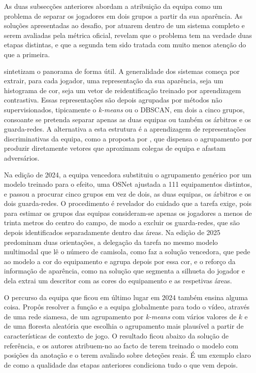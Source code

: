 As duas subsecções anteriores abordam a atribuição da equipa como um problema de separar os jogadores em dois grupos a partir da sua aparência. As soluções apresentadas ao desafio, por atuarem dentro de um sistema completo e serem avaliadas pela métrica oficial, revelam que o problema tem na verdade duas etapas distintas, e que a segunda tem sido tratada com muito menos atenção do que a primeira.

\citet{golovkin2025minimap} sintetizam o panorama de forma útil. A generalidade dos sistemas começa por extrair, para cada jogador, uma representação da sua aparência, seja um histograma de cor, seja um vetor de reidentificação treinado por aprendizagem contrastiva. Essas representações são depois agrupadas por métodos não supervisionados, tipicamente o \emph{k-means} ou o DBSCAN, em dois a cinco grupos, consoante se pretenda separar apenas as duas equipas ou também os árbitros e os guarda-redes. A alternativa a esta estrutura é a aprendizagem de representações discriminativas da equipa, como a proposta por \citet{istasse2019associative}, que dispensa o agrupamento por produzir diretamente vetores que aproximam colegas de equipa e afastam adversários.

Na edição de 2024, a equipa vencedora substituiu o agrupamento genérico por um modelo treinado para o efeito, uma OSNet ajustada a 111 equipamentos distintos, e passou a procurar cinco grupos em vez de dois, as duas equipas, os árbitros e os dois guarda-redes. O procedimento é revelador do cuidado que a tarefa exige, pois para estimar os grupos das equipas consideram-se apenas os jogadores a menos de trinta metros do centro do campo, de modo a excluir os guarda-redes, que são depois identificados separadamente dentro das áreas. Na edição de 2025 predominam duas orientações, a delegação da tarefa no mesmo modelo multimodal que lê o número de camisola, como faz a solução vencedora, que pede ao modelo a cor do equipamento e agrupa depois por essa cor, e o reforço da informação de aparência, como na solução que segmenta a silhueta do jogador e dela extrai um descritor com as cores do equipamento e as respetivas áreas.

O percurso da equipa que ficou em último lugar em 2024 também ensina alguma coisa. Propôs resolver a função e a equipa globalmente para todo o vídeo, através de uma rede siamesa, de um agrupamento por \emph{k-means} com vários valores de $k$ e de uma floresta aleatória que escolhia o agrupamento mais plausível a partir de características de contexto de jogo. O resultado ficou abaixo da solução de referência, e os autores atribuem-no ao facto de terem treinado o modelo com posições da anotação e o terem avaliado sobre deteções reais. É um exemplo claro de como a qualidade das etapas anteriores condiciona tudo o que vem depois.

